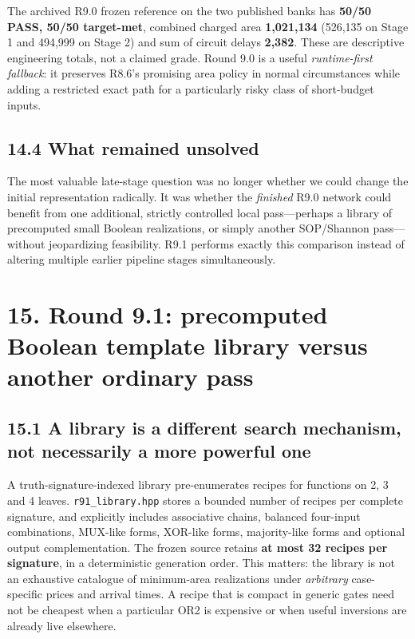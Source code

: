 \documentclass[a4paper,10pt]{article}
\theoremstyle{definition}
\theoremstyle{remark}
\begin{document}
The archived R9.0 frozen reference on the two published banks has \textbf{50/50 PASS, 50/50 target-met}, combined charged area \textbf{1,021,134} (526,135 on Stage 1 and 494,999 on Stage 2) and sum of circuit delays \textbf{2,382}. These are descriptive engineering totals, not a claimed grade. Round 9.0 is a useful \emph{runtime-first fallback}: it preserves R8.6's promising area policy in normal circumstances while adding a restricted exact path for a particularly risky class of short-budget inputs.

\subsection{14.4 What remained unsolved}\label{what-remained-unsolved}

The most valuable late-stage question was no longer whether we could change the initial representation radically. It was whether the \emph{finished} R9.0 network could benefit from one additional, strictly controlled local pass---perhaps a library of precomputed small Boolean realizations, or simply another SOP/Shannon pass---without jeopardizing feasibility. R9.1 performs exactly this comparison instead of altering multiple earlier pipeline stages simultaneously.

\section{15. Round 9.1: precomputed Boolean template library versus another ordinary pass}\label{round-9.1-precomputed-boolean-template-library-versus-another-ordinary-pass}

\subsection{15.1 A library is a different search mechanism, not necessarily a more powerful one}\label{a-library-is-a-different-search-mechanism-not-necessarily-a-more-powerful-one}

A truth-signature-indexed library pre-enumerates recipes for functions on 2, 3 and 4 leaves. \texttt{r91\_library.hpp} stores a bounded number of recipes per complete signature, and explicitly includes associative chains, balanced four-input combinations, MUX-like forms, XOR-like forms, majority-like forms and optional output complementation. The frozen source retains \textbf{at most 32 recipes per signature}, in a deterministic generation order. This matters: the library is not an exhaustive catalogue of minimum-area realizations under \emph{arbitrary} case-specific prices and arrival times. A recipe that is compact in generic gates need not be cheapest when a particular OR2 is expensive or when useful inversions are already live elsewhere.
\end{document}
